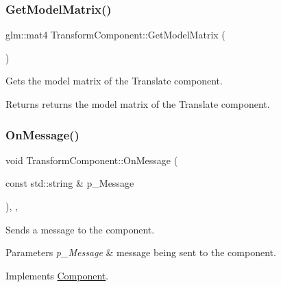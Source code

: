 \subsubsection{\texorpdfstring{GetModelMatrix()}{GetModelMatrix()}}
{\footnotesize\ttfamily glm\+::mat4 Transform\+Component\+::\+Get\+Model\+Matrix (\begin{DoxyParamCaption}{ }\end{DoxyParamCaption})\hspace{0.3cm}{\ttfamily [inline]}}



Gets the model matrix of the Translate component. 

\begin{DoxyReturn}{Returns}
returns the model matrix of the Translate component. 
\end{DoxyReturn}
\mbox{\label{class_transform_component_a07510e9014663febd69f9c00666a3951}} 
\subsubsection{\texorpdfstring{OnMessage()}{OnMessage()}}
{\footnotesize\ttfamily void Transform\+Component\+::\+On\+Message (\begin{DoxyParamCaption}\item[{const std\+::string \&}]{p\+\_\+\+Message }\end{DoxyParamCaption})\hspace{0.3cm}{\ttfamily [inline]}, {\ttfamily [override]}, {\ttfamily [virtual]}}



Sends a message to the component. 


\begin{DoxyParams}{Parameters}
{\em p\+\_\+\+Message} & message being sent to the component. \\
\hline
\end{DoxyParams}


Implements \mbox{\hyperlink{class_component_a1cd106256bf1791f9c6ab347776c7788}{Component}}.

\mbox{\label{class_transform_component_a4e84c8415bc74787d8392182de9c15df}} 
